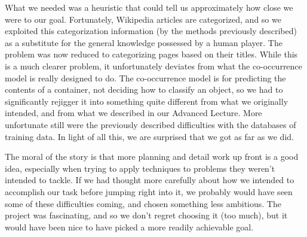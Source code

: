 \documentclass{article}
\begin{document}
What we needed was a heuristic that could tell us approximately how close we were to our goal.
Fortunately, Wikipedia articles are categorized, and so we exploited this categorization information (by the methods previously described)
as a substitute for the general knowledge possessed by a human player.
The problem was now reduced to categorizing pages based on their titles.
While this is a much clearer problem, it unfortunately deviates from what the co-occurrence model is really designed to do.
The co-occurrence model is for predicting the contents of a container, not deciding how to classify an object,
so we had to significantly rejigger it into something quite different from what we originally intended,
and from what we described in our Advanced Lecture.
More unfortunate still were the previously described difficulties with the databases of training data.
In light of all this, we are surprised that we got as far as we did.

The moral of the story is that more planning and detail work up front is a good idea,
especially when trying to apply techniques to problems they weren't intended to tackle.
If we had thought more carefully about how we intended to accomplish our task before jumping right into it,
we probably would have seen some of these difficulties coming, and chosen something less ambitious.
The project was fascinating, and so we don't regret choosing it (too much),
but it would have been nice to have picked a more readily achievable goal.
\end{document}
